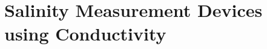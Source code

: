 \section{Salinity Measurement Devices using Conductivity}\label{sec:salinity-measurement-devices}




%
%
%
%
%
%
%
%
%
%
%
%
%
%
%
%
%
%
%
%
%
%
%

